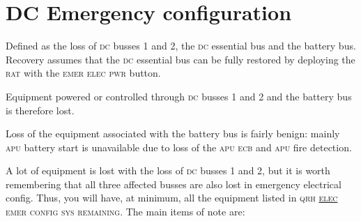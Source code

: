 \documentclass[a5paper,11pt,twoside]{book}
\newcommand{\ac}[1]{{\scshape\MakeLowercase{#1}}}
\newcommand{\ecam}[2]{{\ac{\uline{#1} #2}}}
\begin{document}
\section{DC Emergency configuration}
\label{sec-dc-emer-conf}
Defined as the loss of \ac{DC} busses 1 and 2, the \ac{DC} essential bus and the
battery bus. Recovery assumes that the \ac{DC} essential bus can be fully
restored by deploying the \ac{RAT} with the \ac{EMER ELEC PWR} button.

Equipment powered or controlled through \ac{DC} busses 1 and 2 and the battery
bus is therefore lost.

Loss of the equipment associated with the battery bus is fairly benign: mainly
\ac{APU} battery start is unavailable due to loss of the \ac{APU ECB} and
\ac{APU} fire detection.

A lot of equipment is lost with the loss of \ac{DC} busses 1 and 2, but it is
worth remembering that all three affected busses are also lost in emergency
electrical config. Thus, you will have, at minimum, all the equipment listed in
\ac{QRH} \ecam{ELEC}{emer config sys remaining}. The main items of note are:
\end{document}
